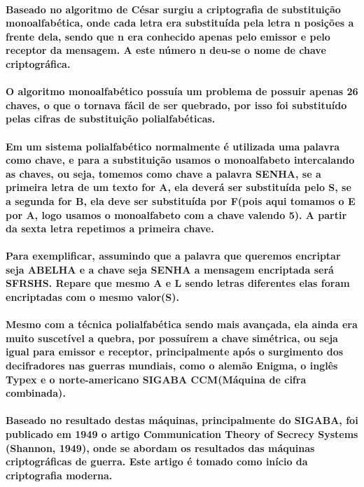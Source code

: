\documentclass{article}
\begin{document}
	\paragraph{
		Baseado no algoritmo de César surgiu a criptografia de substituição monoalfabética, onde cada letra era substituída pela letra n posições a frente dela, sendo que n era conhecido apenas pelo emissor e pelo receptor da mensagem. A este número n deu-se o nome de chave criptográfica.
	}
	\paragraph{
		O algoritmo monoalfabético possuía um problema de possuir apenas 26 chaves, o que o tornava fácil de ser quebrado, por isso foi substituído pelas cifras de substituição polialfabéticas.
	}
	\paragraph{
		Em um sistema polialfabético normalmente é utilizada uma palavra como chave, e para a substituição usamos o monoalfabeto intercalando as chaves, ou seja, tomemos como chave a palavra SENHA, se a primeira letra de um texto for A, ela deverá ser substituída pelo S, se a segunda for B, ela deve ser substituída por F(pois aqui tomamos o E por A, logo usamos o monoalfabeto com a chave valendo 5). A partir da sexta letra repetimos a primeira chave.
	}
	\paragraph{
		Para exemplificar, assumindo que a palavra que queremos encriptar seja ABELHA e a chave seja SENHA a mensagem encriptada será SFRSHS. Repare que mesmo A e L sendo letras diferentes elas foram encriptadas com o mesmo valor(S).
	}
	\paragraph{
		Mesmo com a técnica polialfabética sendo mais avançada, ela ainda era muito suscetível a quebra, por possuírem a chave simétrica, ou seja igual para emissor e receptor, principalmente após o surgimento dos decifradores nas guerras mundiais, como o alemão Enigma, o inglês Typex e o norte-americano SIGABA CCM(Máquina de cifra combinada). 
	}
	\paragraph{
		Baseado no resultado destas máquinas, principalmente do SIGABA, foi publicado em 1949 o artigo Communication Theory of Secrecy Systems (Shannon, 1949), onde se abordam os resultados das máquinas criptográficas de guerra. Este artigo é tomado como início da criptografia moderna.
	}
\end{document}
